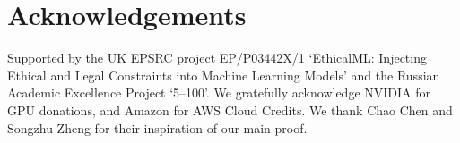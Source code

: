 



\section*{Acknowledgements}
Supported by the UK EPSRC project EP/P03442X/1 `EthicalML: Injecting Ethical and Legal Constraints into Machine Learning Models'
and the Russian Academic Excellence Project `5--100'.
We gratefully acknowledge NVIDIA for GPU donations, and Amazon for AWS Cloud Credits.
We thank Chao Chen and Songzhu Zheng for their inspiration of our main proof.


